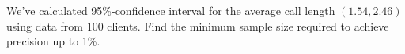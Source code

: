 
\begin{question}
We've calculated 95\%-confidence interval for the average call length \((1.54,2.46)\) using data from 100 clients.
Find the minimum sample size required to achieve precision up to 1\%.
\end{question}


